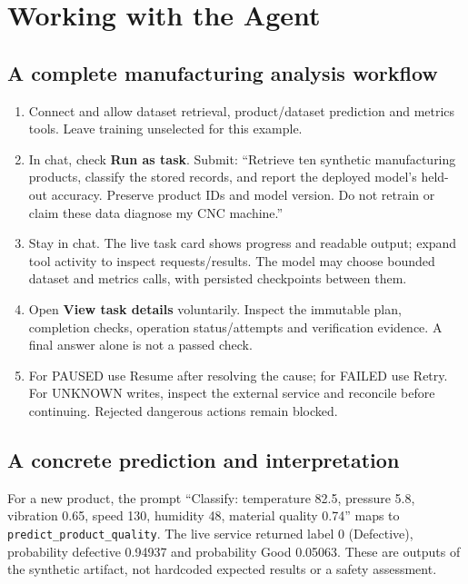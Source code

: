 \chapter{Working with the Agent}
\section{A complete manufacturing analysis workflow}
\begin{enumerate}
\item Connect and allow dataset retrieval, product/dataset prediction and metrics tools. Leave training unselected for this example.
\item In chat, check \textbf{Run as task}. Submit: ``Retrieve ten synthetic manufacturing products, classify the stored records, and report the deployed model's held-out accuracy. Preserve product IDs and model version. Do not retrain or claim these data diagnose my CNC machine.''
\item Stay in chat. The live task card shows progress and readable output; expand tool activity to inspect requests/results. The model may choose bounded dataset and metrics calls, with persisted checkpoints between them.
\item Open \textbf{View task details} voluntarily. Inspect the immutable plan, completion checks, operation status/attempts and verification evidence. A final answer alone is not a passed check.
\item For PAUSED use Resume after resolving the cause; for FAILED use Retry. For UNKNOWN writes, inspect the external service and reconcile before continuing. Rejected dangerous actions remain blocked.
\end{enumerate}
\section*{A concrete prediction and interpretation}
For a new product, the prompt ``Classify: temperature 82.5, pressure 5.8, vibration 0.65, speed 130, humidity 48, material quality 0.74'' maps to \texttt{predict\_product\_quality}. The live service returned label 0 (Defective), probability defective 0.94937 and probability Good 0.05063. These are outputs of the synthetic artifact, not hardcoded expected results or a safety assessment.
